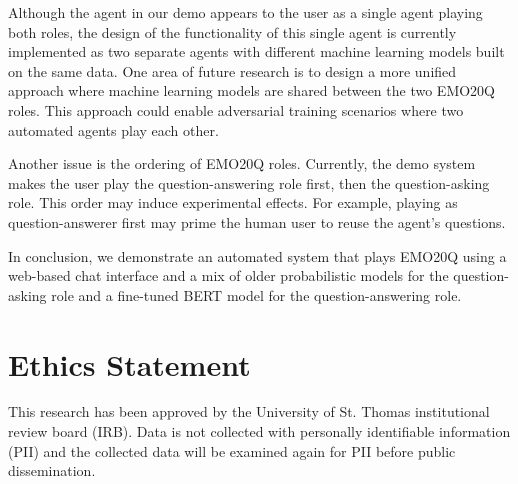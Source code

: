\documentclass[conference]{IEEEtran}
\begin{document}
Although the agent in our demo appears to the user as a single agent
playing both roles, the design of the functionality of this single
agent is currently implemented as two separate agents with different
machine learning models built on the same data. One area of future
research is to design a more unified approach where machine learning
models are shared between the two EMO20Q roles.  This approach could
enable adversarial training scenarios where two automated agents play
each other.




Another issue is the ordering of EMO20Q roles.  Currently, the demo
system makes the user play the question-answering role first, then the
question-asking role. This order may induce experimental effects.  For
example, playing as question-answerer first may prime the human user
to reuse the agent's questions.


In conclusion, we demonstrate an automated system that plays EMO20Q
using a web-based chat interface and a mix of older probabilistic
models for the question-asking role and a fine-tuned BERT model for
the question-answering role.




\section{Ethics Statement}

This research has been approved by the
University of St. Thomas
institutional review board (IRB).  Data is not collected with
personally identifiable information (PII) and the collected data will be
examined again for PII before public dissemination.




%

\end{document}
